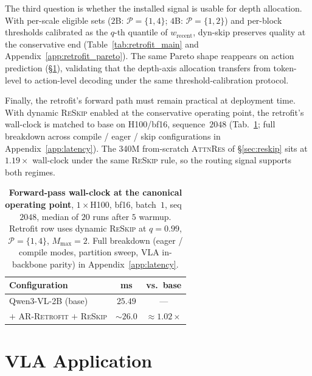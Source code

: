 \documentclass{article}
\newcommand{\attnres}{\textsc{AttnRes}}
\newcommand{\reskip}{\textsc{ReSkip}}
\newcommand{\retrofit}{\textsc{AR-Retrofit}}
\begin{document}
The third question is whether the installed signal is usable for depth allocation. With per-scale eligible sets ($2$B: $\mathcal{P}{=}\{1,4\}$; $4$B: $\mathcal{P}{=}\{1,2\}$) and per-block thresholds calibrated as the $q$-th quantile of $w_{\text{recent}}$, dyn-skip preserves quality at the conservative end (Table~\ref{tab:retrofit_main} and Appendix~\ref{app:retrofit_pareto}). The same Pareto shape reappears on action prediction (\S\ref{sec:vla}), validating that the depth-axis allocation transfers from token-level to action-level decoding under the same threshold-calibration protocol.

Finally, the retrofit's forward path must remain practical at deployment time. With dynamic \reskip{} enabled at the conservative operating point, the retrofit's wall-clock is matched to base on H100/bf16, sequence~$2048$ (Tab.~\ref{tab:retrofit_latency}; full breakdown across compile / eager / skip configurations in Appendix~\ref{app:latency}). The 340M from-scratch \attnres{} of \S\ref{sec:reskip} sits at $1.19\times$ wall-clock under the same \reskip{} rule, so the routing signal supports both regimes.

\begin{table}[t]
\caption{\textbf{Forward-pass wall-clock at the canonical operating point}, $1{\times}$H100, bf16, batch~$1$, seq~$2048$, median of $20$ runs after $5$ warmup. Retrofit row uses dynamic \reskip{} at $q{=}0.99$, $\mathcal{P}{=}\{1,4\}$, $M_{\max}{=}2$. Full breakdown (eager / compile modes, partition sweep, VLA in-backbone parity) in Appendix~\ref{app:latency}.}
\label{tab:retrofit_latency}
\centering\small
\setlength{\tabcolsep}{4pt}
\begin{tabular}{lcc}
\toprule
Configuration & ms & vs.\ base \\
\midrule
Qwen3-VL-2B (base)                          & $25.49$ & --- \\
$+$ \retrofit{} $+$ \reskip{}               & $\sim 26.0$ & $\approx 1.02\times$ \\
\bottomrule
\end{tabular}
\end{table}

\section{VLA Application}
\label{sec:vla}
\end{document}
